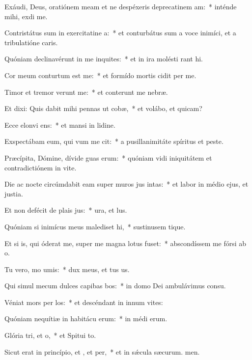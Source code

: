 \item Exáudi, Deus, oratiónem meam et ne despéxeris deprecatinem am:~* inténde mihi,  exdi me.
\item Contristátus sum in exercitatine a:~* et conturbátus sum a voce inimíci, et a tribulatióne caris.
\item Quóniam declinavérunt in me inquites:~* et in ira molésti rant hi.
\item Cor meum conturtum est  me:~* et formído mortis cidit per me.
\item Timor et tremor verunt  me:~* et conterunt me nebræ.
\item Et dixi: Quis dabit mihi pennas ut cobæ,~* et volábo, et quicam?
\item Ecce elonvi ens:~* et mansi in lidine.
\item Exspectábam eum, qui vum me cit:~* a pusillanimitáte spíritus et peste.
\item Præcípita, Dómine, dívide guas erum:~* quóniam vidi iniquitátem et contradictiónem in vite.
\item Die ac nocte circúmdabit eam super muros jus intas:~* et labor in médio ejus, et justia.
\item Et non defécit de plais jus:~* ura, et lus.
\item Quóniam si inimícus meus malediset hi,~* sustinusem tique.
\item Et si is, qui óderat me, super me magna lotus fuset:~* abscondíssem me fórsi ab o.
\item Tu vero, mo umis:~* dux meus, et tus us.
\item Qui simul mecum dulces capibas bos:~* in domo Dei ambulávimus  consu.
\item Véniat mors per los:~* et descéndant in innum vites:
\item Quóniam nequítiæ in habitácu erum:~* in médi erum.
\item Glória tri, et o,~* et Spitui to.
\item Sicut erat in princípio, et , et per,~* et in sǽcula sæcurum. men.
